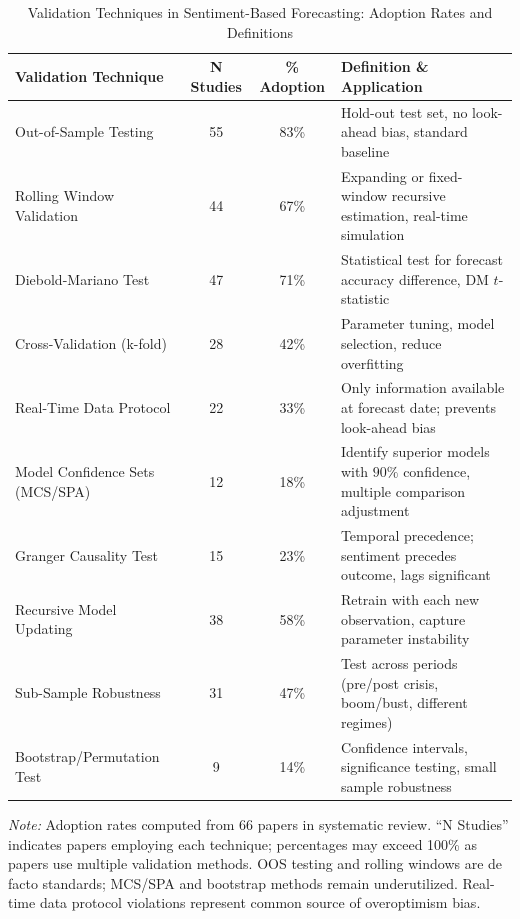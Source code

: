 \begin{table}[h]
\centering
\caption{Validation Techniques in Sentiment-Based Forecasting: Adoption Rates and Definitions}
\label{tab:validation_adoption}
\small
\begin{tabular}{|l|c|c|l|}
\hline
\textbf{Validation Technique} & \textbf{N Studies} & \textbf{\% Adoption} & \textbf{Definition \& Application} \\
\hline
Out-of-Sample Testing & 55 & 83\% & Hold-out test set, no look-ahead bias, standard baseline \\
\hline
Rolling Window Validation & 44 & 67\% & Expanding or fixed-window recursive estimation, real-time simulation \\
\hline
Diebold-Mariano Test & 47 & 71\% & Statistical test for forecast accuracy difference, DM $t$-statistic \\
\hline
Cross-Validation (k-fold) & 28 & 42\% & Parameter tuning, model selection, reduce overfitting \\
\hline
Real-Time Data Protocol & 22 & 33\% & Only information available at forecast date; prevents look-ahead bias \\
\hline
Model Confidence Sets (MCS/SPA) & 12 & 18\% & Identify superior models with $90\%$ confidence, multiple comparison adjustment \\
\hline
Granger Causality Test & 15 & 23\% & Temporal precedence; sentiment precedes outcome, lags significant \\
\hline
Recursive Model Updating & 38 & 58\% & Retrain with each new observation, capture parameter instability \\
\hline
Sub-Sample Robustness & 31 & 47\% & Test across periods (pre/post crisis, boom/bust, different regimes) \\
\hline
Bootstrap/Permutation Test & 9 & 14\% & Confidence intervals, significance testing, small sample robustness \\
\hline
\end{tabular}
\raggedright\footnotesize
\textit{Note:} Adoption rates computed from 66 papers in systematic review. ``N Studies'' indicates papers employing each technique; percentages may exceed 100\% as papers use multiple validation methods. OOS testing and rolling windows are de facto standards; MCS/SPA and bootstrap methods remain underutilized. Real-time data protocol violations represent common source of overoptimism bias.
\end{table}

\vspace{2em}

